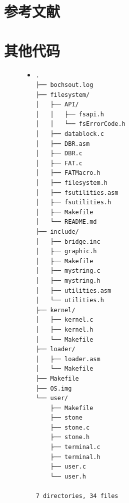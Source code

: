 \documentclass[a4paper]{article}
\begin{document}
\begin{appendices}
\section{参考文献} \label{sec:reference}
\section{其他代码} \label{sec:otherCode}
\begin{figure}
\begin{itemize}
\item[] \begin{lstlisting}[label=lst:wholepjtree, caption=项目总目录树]
.
├── bochsout.log
├── filesystem/
│   ├── API/
│   │   ├── fsapi.h
│   │   └── fsErrorCode.h
│   ├── datablock.c
│   ├── DBR.asm
│   ├── DBR.c
│   ├── FAT.c
│   ├── FATMacro.h
│   ├── filesystem.h
│   ├── fsutilities.asm
│   ├── fsutilities.h
│   ├── Makefile
│   └── README.md
├── include/
│   ├── bridge.inc
│   ├── graphic.h
│   ├── Makefile
│   ├── mystring.c
│   ├── mystring.h
│   ├── utilities.asm
│   └── utilities.h
├── kernel/
│   ├── kernel.c
│   ├── kernel.h
│   └── Makefile
├── loader/
│   ├── loader.asm
│   └── Makefile
├── Makefile
├── OS.img
└── user/
    ├── Makefile
    ├── stone
    ├── stone.c
    ├── stone.h
    ├── terminal.c
    ├── terminal.h
    ├── user.c
    └── user.h

7 directories, 34 files
\end{lstlisting}
\end{itemize}
\end{figure}
\end{appendices}
\end{document}
